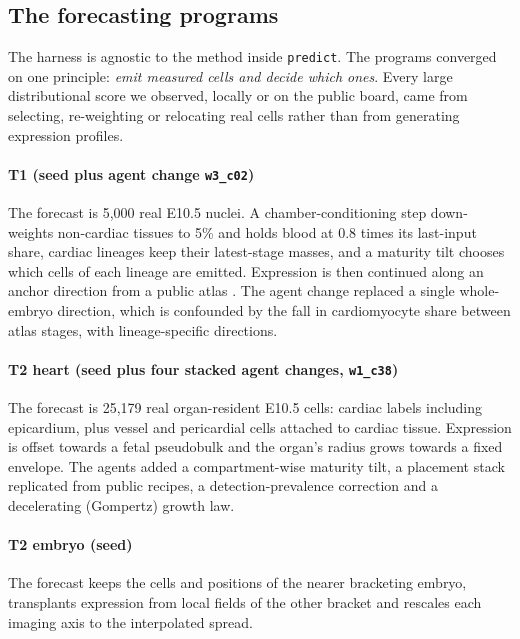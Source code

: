 \documentclass[9pt,twocolumn,a4paper]{extarticle}
\newcommand{\code}[1]{\texttt{\small #1}}
\begin{document}
\subsection{The forecasting programs}
\label{sec:programs}

The harness is agnostic to the method inside \code{predict}. The programs converged on one principle: \emph{emit
measured cells and decide which ones}. Every large distributional score we observed, locally or on the public board,
came from selecting, re-weighting or relocating real cells rather than from generating expression profiles.

\paragraph{T1 (seed plus agent change \code{w3\_c02})} The forecast is 5,000 real E10.5 nuclei. A
chamber-conditioning step down-weights non-cardiac tissues to 5\% and holds blood at 0.8 times its last-input share,
cardiac lineages keep their latest-stage masses, and a maturity tilt chooses which cells of each lineage are
emitted. Expression is then continued along an anchor direction from a public atlas \cite{qiu2024timelapse}. The
agent change replaced a single whole-embryo direction, which is confounded by the fall in cardiomyocyte share
between atlas stages, with lineage-specific directions.

\paragraph{T2 heart (seed plus four stacked agent changes, \code{w1\_c38})} The forecast is 25,179 real organ-resident E10.5 cells: cardiac labels including epicardium, plus vessel and pericardial cells attached to cardiac tissue. Expression is offset towards a fetal pseudobulk \cite{feulner2024} and the organ's radius grows towards a fixed envelope. The agents added a compartment-wise maturity tilt, a placement stack replicated from public recipes, a detection-prevalence correction and a decelerating (Gompertz) growth law.

\paragraph{T2 embryo (seed)} The forecast keeps the cells and positions of the nearer bracketing embryo, transplants
expression from local fields of the other bracket and rescales each imaging axis to the interpolated spread.
\end{document}
